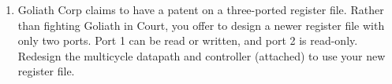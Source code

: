 \documentclass{e85}
\begin{document}
\begin{enumerate}

\item Goliath Corp claims to have a patent on a three-ported register
  file.  Rather than fighting Goliath in Court, you offer to design a
  newer register file with only two ports.  Port 1 can be read or
  written, and port 2 is read-only.  Redesign the multicycle datapath
  and controller (attached) to use your new register file.


\end{enumerate}
\end{document}
